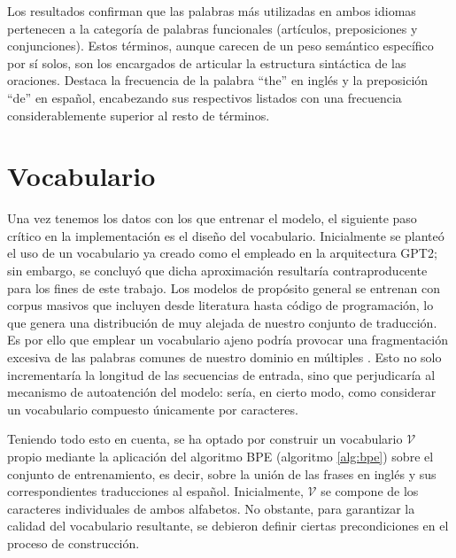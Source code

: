 Los resultados confirman que las palabras más utilizadas en ambos idiomas pertenecen a la categoría de palabras 
funcionales (artículos, preposiciones y conjunciones). Estos términos, aunque carecen de un peso semántico específico por sí solos, 
son los encargados de articular la estructura sintáctica de las oraciones. Destaca la frecuencia de la palabra ``the'' en inglés y 
la preposición ``de'' en español, encabezando sus respectivos listados con una frecuencia considerablemente superior al resto de términos.


\section{Vocabulario}

Una vez tenemos los datos con los que entrenar el modelo, el siguiente paso crítico en la implementación es el diseño del vocabulario. 
Inicialmente se planteó el uso de un vocabulario ya creado como el empleado en la arquitectura GPT2; sin embargo, se concluyó que dicha 
aproximación resultaría contraproducente para los fines de este trabajo. Los modelos de propósito general se entrenan con corpus masivos 
que incluyen desde literatura hasta código de programación, lo que genera una distribución de \tokens{} muy alejada de nuestro conjunto de 
traducción. Es por ello que emplear un vocabulario ajeno podría provocar una fragmentación excesiva de las palabras comunes de nuestro dominio en 
múltiples \tokens{}. Esto no solo incrementaría la longitud de las secuencias de entrada, sino que perjudicaría al mecanismo de autoatención 
del modelo: sería, en cierto modo, como considerar un vocabulario compuesto únicamente por caracteres. 



Teniendo todo esto en cuenta, se ha optado por construir un vocabulario $\mathcal{V}$ propio mediante la aplicación del algoritmo BPE 
(algoritmo \ref{alg:bpe}) sobre el conjunto de entrenamiento, es decir, sobre la unión de las frases en inglés y sus correspondientes 
traducciones al español. Inicialmente, $\mathcal{V}$ se compone de los caracteres individuales de ambos alfabetos. 
No obstante, para garantizar la calidad del vocabulario resultante, se debieron definir ciertas precondiciones en el proceso de construcción.

